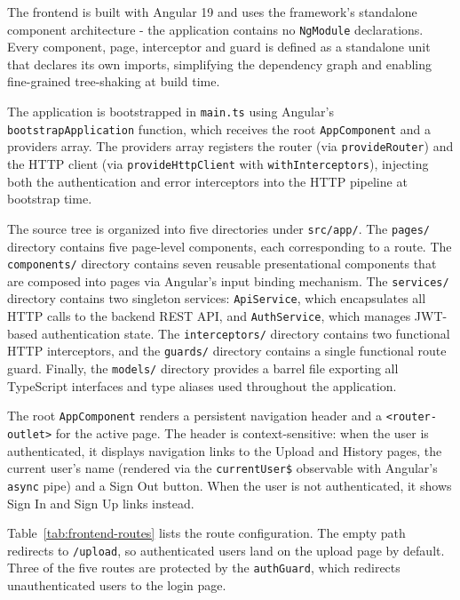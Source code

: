  \par The frontend is built with Angular 19 and uses the framework's standalone component architecture - the application contains no \texttt{NgModule} declarations. Every component, page, interceptor and guard is defined as a standalone unit that declares its own imports, simplifying the dependency graph and enabling fine-grained tree-shaking at build time.

The application is bootstrapped in \texttt{main.ts} using Angular's \texttt{bootstrapA\-ppli\-ca\-tion} function, which receives the root \texttt{AppComponent} and a providers array. The providers array registers the router (via \texttt{provideRouter}) and the HTTP client (via \texttt{pro\-vid\-eHttp\-Client} with \texttt{withInterceptors}), injecting both the authentication and error interceptors into the HTTP pipeline at bootstrap time.

The source tree is organized into five directories under \texttt{src/app/}. The \texttt{pages/} directory contains five page-level components, each corresponding to a route. The \texttt{components/} directory contains seven reusable presentational components that are composed into pages via Angular's input binding mechanism. The \texttt{services/} directory contains two singleton services: \texttt{ApiService}, which encapsulates all HTTP calls to the backend REST API, and \texttt{AuthService}, which manages JWT-based authentication state. The \texttt{interceptors/} directory contains two functional HTTP interceptors, and the \texttt{guards/} directory contains a single functional route guard. Finally, the \texttt{models/} directory provides a barrel file exporting all TypeScript interfaces and type aliases used throughout the application.

The root \texttt{AppComponent} renders a persistent navigation header and a \texttt{<rou\-ter-out\-let>} for the active page. The header is context-sensitive: when the user is authenticated, it displays navigation links to the Upload and History pages, the current user's name (rendered via the \texttt{currentUser\$} observable with Angular's \texttt{async} pipe) and a Sign Out button. When the user is not authenticated, it shows Sign In and Sign Up links instead.

Table~\ref{tab:frontend-routes} lists the route configuration. The empty path redirects to \texttt{/upload}, so authenticated users land on the upload page by default. Three of the five routes are protected by the \texttt{authGuard}, which redirects unauthenticated users to the login page.

